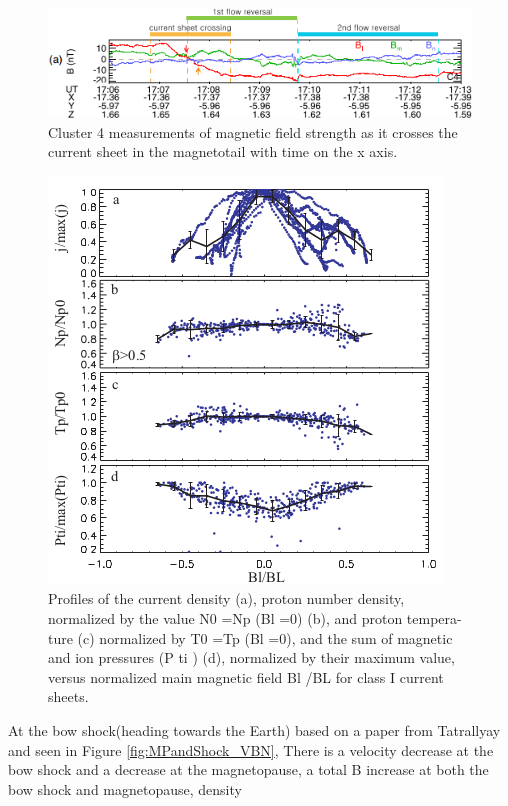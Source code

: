 \begin{figure}
	\centering
	\includegraphics[scale=0.75]{images/Cur_sheet_B.png}
	\caption{Cluster 4 measurements of magnetic field strength as it crosses the
	current sheet in the magnetotail with time on the x axis.}
    \label{fig:Cur_sheet_B}
	\figSpace
\end{figure}

\begin{figure}
	\centering
	\includegraphics[scale=0.75]{images/Cur_sheet_N.png}
	\caption{Profiles of the current density (a), proton number density,
normalized by the value N0 =Np (Bl =0) (b), and proton tempera-
ture (c) normalized by T0 =Tp (Bl =0), and the sum of magnetic and
ion pressures (P ti ) (d), normalized by their maximum value, versus
normalized main magnetic field Bl /BL for class I current sheets.
}
    \label{fig:Cur_sheet_N}
	\figSpace
\end{figure}
At the bow shock(heading towards the Earth) based on a paper from Tatrallyay
\cite{Tatrallyay2012} and seen in Figure \ref{fig:MPandShock_VBN}, There is a
velocity decrease at the bow shock and a decrease at the magnetopause, a total B increase at both the bow shock and magnetopause, density
